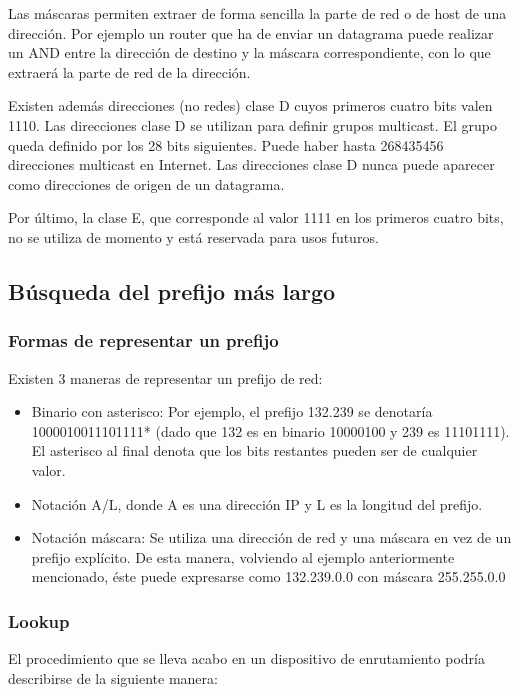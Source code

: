 Las máscaras permiten extraer de forma sencilla la parte de red o de host de una dirección. Por ejemplo un router que ha de enviar un datagrama puede realizar un AND entre la dirección de destino y la máscara correspondiente, con lo que extraerá la parte de red de la dirección.

Existen además direcciones (no redes) clase D cuyos primeros cuatro bits valen 1110. Las direcciones clase D se utilizan para definir grupos multicast. El grupo queda definido por los 28 bits siguientes. Puede haber hasta 268435456 direcciones multicast en Internet. Las direcciones clase D nunca puede aparecer como direcciones de origen de un datagrama.

Por último, la clase E, que corresponde al valor 1111 en los primeros cuatro bits, no se utiliza de momento y está reservada para usos futuros.



\subsection{Búsqueda del prefijo más largo}

\subsubsection{Formas de representar un prefijo}

Existen 3 maneras de representar un prefijo de red:

\begin{itemize}
	\item Binario con asterisco: Por ejemplo, el prefijo 132.239 se denotaría 1000010011101111* (dado que 132 es en binario 10000100 y 239 es 11101111). El asterisco al final denota que los bits restantes pueden ser de cualquier valor.
	\item Notación A/L, donde A es una dirección IP y L es la longitud del prefijo.
	\item Notación máscara: Se utiliza una dirección de red y una máscara en vez de un prefijo explícito. De esta manera, volviendo al ejemplo anteriormente mencionado, éste puede expresarse como 132.239.0.0 con máscara 255.255.0.0
\end{itemize}

\subsubsection{Lookup}

El procedimiento que se lleva acabo en un dispositivo de enrutamiento podría describirse de la siguiente manera:

